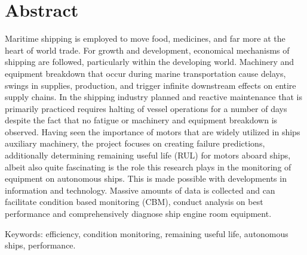 
\section*{Abstract}
\label{sec:Abstract}
Maritime shipping is employed to move food, medicines, and far more at the heart of world
trade. For growth and development, economical mechanisms of shipping are followed,
particularly within the developing world. Machinery and equipment breakdown that occur
during marine transportation cause delays, swings in supplies, production, and trigger
infinite downstream effects on entire supply chains. In the shipping industry planned and
reactive maintenance that is primarily practiced requires halting of vessel operations for a
number of days despite the fact that no fatigue or machinery and equipment breakdown is
observed. Having seen the importance of motors that are widely utilized in ships auxiliary
machinery, the project focuses on creating failure predictions, additionally determining
remaining useful life (RUL) for motors aboard ships, albeit also quite fascinating is the
role this research plays in the monitoring of equipment on autonomous ships. This is
made possible with developments in information and technology. Massive amounts of
data is collected and can facilitate condition based monitoring (CBM), conduct analysis
on best performance and comprehensively diagnose ship engine room equipment.

Keywords: efficiency, condition monitoring, remaining useful life, autonomous ships, performance. 

 


